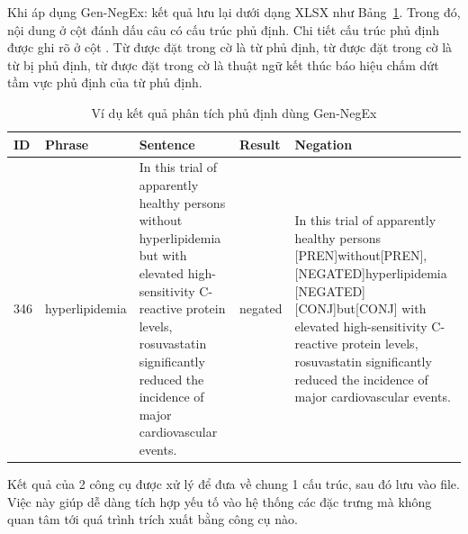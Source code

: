 Khi áp dụng Gen-NegEx: kết quả lưu lại dưới dạng XLSX như Bảng~\ref{table:Gen-NegEx}. Trong đó, nội dung  ở cột  đánh dấu câu có cấu trúc phủ định. Chi tiết cấu trúc phủ định được ghi rõ ở cột . Từ được đặt trong cờ \xquote{[PREN]} là từ phủ định, từ được đặt trong cờ \xquote{[NEGATED]} là từ bị phủ định, từ được đặt trong cờ \xquote{[CONJ]} là thuật ngữ kết thúc báo hiệu chấm dứt tầm vực phủ định của từ phủ định.\\

\begin{table}[H]
\centering
\caption{Ví dụ kết quả phân tích phủ định dùng Gen-NegEx}
\label{table:Gen-NegEx}
\begin{tabular}{|l|l|m{}|l|m{}|}
\hline
ID & Phrase & Sentence & Result & Negation \\ \hline
346 & hyperlipidemia & In this trial of apparently healthy persons without hyperlipidemia but with elevated high-sensitivity C-reactive protein levels, rosuvastatin significantly reduced the incidence of major cardiovascular events. & negated & In this trial of apparently healthy persons {[}PREN{]}without{[}PREN{]}, {[}NEGATED{]}hyperlipidemia {[}NEGATED{]} {[}CONJ{]}but{[}CONJ{]} with elevated high-sensitivity C-reactive protein levels, rosuvastatin significantly reduced the incidence of major cardiovascular events. \\ \hline
\end{tabular}
\end{table}


Kết quả của 2 công cụ được xử lý để đưa về chung 1 cấu trúc, sau đó lưu vào file. Việc này giúp dễ dàng tích hợp yếu tố vào hệ thống các đặc trưng mà không quan tâm tới quá trình trích xuất bằng công cụ nào.\\

